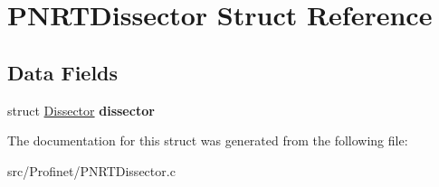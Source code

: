 \hypertarget{struct_p_n_r_t_dissector}{}\section{P\+N\+R\+T\+Dissector Struct Reference}
\label{struct_p_n_r_t_dissector}
\subsection*{Data Fields}
\begin{DoxyCompactItemize}
\item 
\hypertarget{struct_p_n_r_t_dissector_a2ec7a75e801e4a714f32310cdf37546f}{}struct \hyperlink{struct_dissector}{Dissector} {\bfseries dissector}\label{struct_p_n_r_t_dissector_a2ec7a75e801e4a714f32310cdf37546f}

\end{DoxyCompactItemize}


The documentation for this struct was generated from the following file\+:\begin{DoxyCompactItemize}
\item 
src/\+Profinet/P\+N\+R\+T\+Dissector.\+c\end{DoxyCompactItemize}
